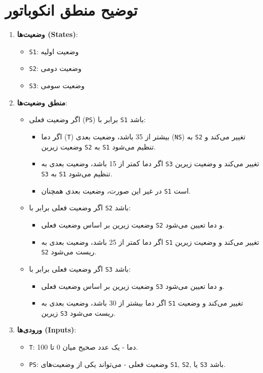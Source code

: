 \section*{توضیح منطق انکوباتور}

\begin{enumerate}
	\item \textbf{وضعیت‌ها (States)}:
	\begin{itemize}
		\item \texttt{S1}: وضعیت اولیه
		\item \texttt{S2}: وضعیت دومی
		\item \texttt{S3}: وضعیت سومی
	\end{itemize}
	
	\item \textbf{منطق وضعیت‌ها}:
	\begin{itemize}
		\item اگر وضعیت فعلی (\texttt{PS}) برابر با \texttt{S1} باشد:
		\begin{itemize}
			\item اگر دما (\texttt{T}) بیشتر از 35 باشد، وضعیت بعدی (\texttt{NS}) به \texttt{S2} تغییر می‌کند و وضعیت زیرین \texttt{S2} به \texttt{S1} تنظیم می‌شود.
			\item اگر دما کمتر از 15 باشد، وضعیت بعدی به \texttt{S3} تغییر می‌کند و وضعیت زیرین \texttt{S3} به \texttt{S1} تنظیم می‌شود.
			\item در غیر این صورت، وضعیت بعدی همچنان \texttt{S1} است.
		\end{itemize}
		\item اگر وضعیت فعلی برابر با \texttt{S2} باشد:
		\begin{itemize}
			\item وضعیت زیرین بر اساس وضعیت فعلی \texttt{S2} و دما تعیین می‌شود.
			\item اگر دما کمتر از 25 باشد، وضعیت بعدی به \texttt{S1} تغییر می‌کند و وضعیت زیرین \texttt{S2} ریست می‌شود.
		\end{itemize}
		\item اگر وضعیت فعلی برابر با \texttt{S3} باشد:
		\begin{itemize}
			\item وضعیت زیرین بر اساس وضعیت فعلی \texttt{S3} و دما تعیین می‌شود.
			\item اگر دما بیشتر از 30 باشد، وضعیت بعدی به \texttt{S1} تغییر می‌کند و وضعیت زیرین \texttt{S3} ریست می‌شود.
		\end{itemize}
	\end{itemize}

	\item \textbf{ورودی‌ها (Inputs)}:
	\begin{itemize}
		\item \texttt{T}: دما - یک عدد صحیح میان 0 تا 100.
		\item \texttt{PS}: وضعیت فعلی - می‌تواند یکی از وضعیت‌های \texttt{S1}, \texttt{S2}, یا \texttt{S3} باشد.
	\end{itemize}
	

\end{enumerate}
